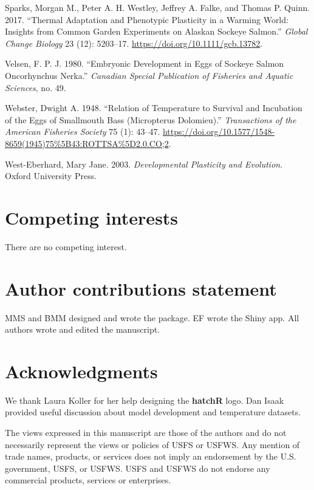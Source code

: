 \documentclass[webpdf,large,contemporary,namedate]{oup-authoring-template}
\newlength{\cslhangindent}
\newenvironment{CSLReferences}[2] %
 {\begin{list}{}{%
  \setlength{\itemindent}{0pt}
  \setlength{\leftmargin}{0pt}
  \setlength{\parsep}{0pt}
  \ifodd #1
   \setlength{\leftmargin}{\cslhangindent}
   \setlength{\itemindent}{-1\cslhangindent}
  \fi
  \setlength{\itemsep}{#2\baselineskip}}}
 {\end{list}}
\theoremstyle{thmstyleone}
\theoremstyle{thmstyletwo}
\theoremstyle{thmstylethree}
\begin{document}
\begin{CSLReferences}{1}{0}
Sparks, Morgan M., Peter A. H. Westley, Jeffrey A. Falke, and Thomas P.
Quinn. 2017. {``Thermal Adaptation and Phenotypic Plasticity in a
Warming World: Insights from Common Garden Experiments on Alaskan
Sockeye Salmon.''} \emph{Global Change Biology} 23 (12): 5203--17.
\url{https://doi.org/10.1111/gcb.13782}.

Velsen, F. P. J. 1980. {``Embryonic Development in Eggs of Sockeye
Salmon Oncorhynchus Nerka.''} \emph{Canadian Special Publication of
Fisheries and Aquatic Sciences}, no. 49.

Webster, Dwight A. 1948. {``Relation of Temperature to Survival and
Incubation of the Eggs of Smallmouth Bass (Micropterus Dolomieu).''}
\emph{Transactions of the American Fisheries Society} 75 (1): 43--47.
\url{https://doi.org/10.1577/1548-8659(1945)75\%5B43:ROTTSA\%5D2.0.CO;2}.

West-Eberhard, Mary Jane. 2003. \emph{Developmental Plasticity and
Evolution}. Oxford University Press.

\end{CSLReferences}

\section{Competing interests}

There are no competing interest.

\section{Author contributions statement}

MMS and BMM designed and wrote the package. EF wrote the Shiny app. All
authors wrote and edited the manuscript.

\section{Acknowledgments}

We thank Laura Koller for her help designing the \textbf{hatchR} logo.
Dan Isaak provided useful discussion about model development and
temperature datasets.

The views expressed in this manuscript are those of the authors and do
not necessarily represent the views or policies of USFS or USFWS. Any
mention of trade names, products, or services does not imply an
endorsement by the U.S. government, USFS, or USFWS. USFS and USFWS do
not endorse any commercial products, services or enterprises.

\end{document}

